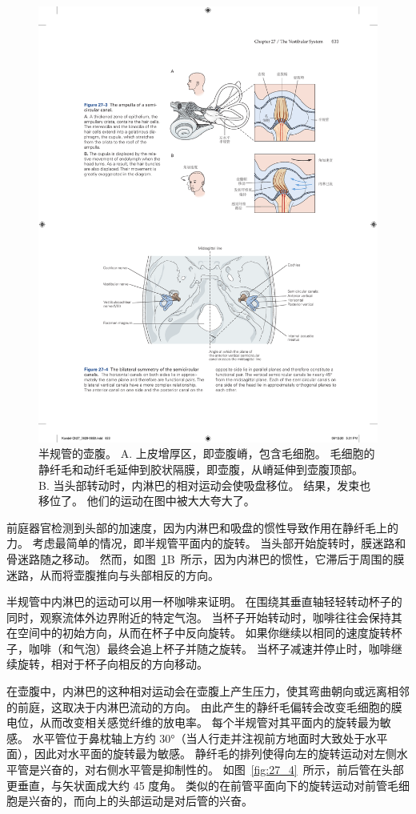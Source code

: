 \begin{figure}[htbp]
	\centering
	\includegraphics[width=0.89\linewidth]{chap27/fig_27_3}
	\caption{半规管的壶腹。
		A. 上皮增厚区，即壶腹嵴，包含毛细胞。
		毛细胞的静纤毛和动纤毛延伸到胶状隔膜，即壶腹，从嵴延伸到壶腹顶部。
		B. 当头部转动时，内淋巴的相对运动会使吸盘移位。
		结果，发束也移位了。
		他们的运动在图中被大大夸大了。}
	\label{fig:27_3}
\end{figure}


前庭器官检测到头部的加速度，因为内淋巴和吸盘的惯性导致作用在静纤毛上的力。
考虑最简单的情况，即半规管平面内的旋转。
当头部开始旋转时，膜迷路和骨迷路随之移动。
然而，如图~\ref{fig:27_3}B~所示，因为内淋巴的惯性，它滞后于周围的膜迷路，从而将壶腹推向与头部相反的方向。


半规管中内淋巴的运动可以用一杯咖啡来证明。
在围绕其垂直轴轻轻转动杯子的同时，观察流体外边界附近的特定气泡。
当杯子开始转动时，咖啡往往会保持其在空间中的初始方向，从而在杯子中反向旋转。
如果你继续以相同的速度旋转杯子，咖啡（和气泡）最终会追上杯子并随之旋转。
当杯子减速并停止时，咖啡继续旋转，相对于杯子向相反的方向移动。


在壶腹中，内淋巴的这种相对运动会在壶腹上产生压力，使其弯曲朝向或远离相邻的前庭，这取决于内淋巴流动的方向。
由此产生的静纤毛偏转会改变毛细胞的膜电位，从而改变相关感觉纤维的放电率。
每个半规管对其平面内的旋转最为敏感。
水平管位于鼻枕轴上方约 30°（当人行走并注视前方地面时大致处于水平面），因此对水平面的旋转最为敏感。
静纤毛的排列使得向左的旋转运动对左侧水平管是兴奋的，对右侧水平管是抑制性的。
如图~\ref{fig:27_4}~所示，前后管在头部更垂直，与矢状面成大约 45 度角。 
类似的在前管平面向下的旋转运动对前管毛细胞是兴奋的，而向上的头部运动是对后管的兴奋。


